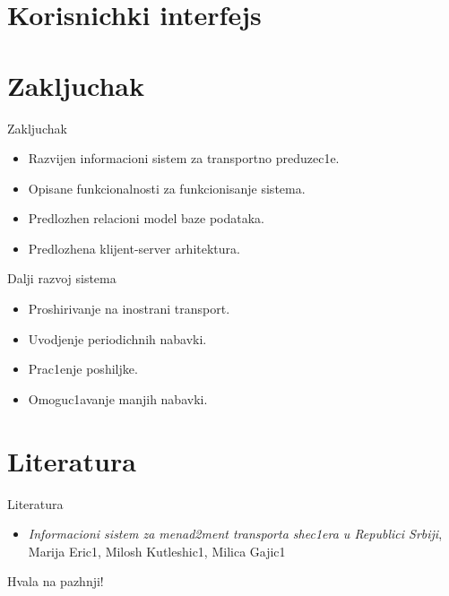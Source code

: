 \documentclass[11pt]{beamer}
\begin{document}
\section{Korisnichki interfejs}


\section{Zakljuchak}
\begin{frame}{Zakljuchak}
    \begin{itemize}
        \item Razvijen informacioni sistem za transportno preduzec1e.
        \item Opisane funkcionalnosti za funkcionisanje sistema.
        \item Predlozhen relacioni model baze podataka.
        \item Predlozhena klijent-server arhitektura.
    \end{itemize}
\end{frame}

\begin{frame}{Dalji razvoj sistema}
    \begin{itemize}
        \item Proshirivanje na inostrani transport.
        
        \medskip
        
        \item Uvodjenje periodichnih nabavki.
        
        \medskip
        \item Prac1enje poshiljke.
        \medskip
        \item Omoguc1avanje manjih nabavki.
    \end{itemize}
\end{frame}

\section{Literatura}

\begin{frame}{Literatura}
    
    \begin{itemize}
        \item{\textit{Informacioni sistem za menad2ment transporta shec1era u Republici Srbiji}, Marija Eric1, Milosh Kutleshic1, Milica Gajic1}
    \end{itemize}
    
\end{frame}

\begin{frame}
\begin{center}
    Hvala na pazhnji!
\end{center}

\end{frame}
\end{document}
